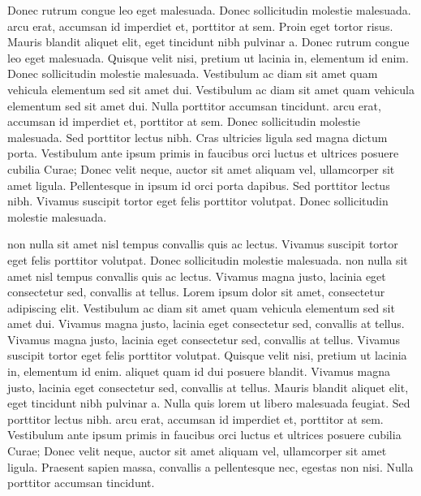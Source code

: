 \documentclass{article}
\begin{document}
Donec rutrum congue leo eget malesuada. Donec sollicitudin molestie malesuada.  arcu erat, accumsan id imperdiet et, porttitor at sem. Proin eget tortor risus. Mauris blandit aliquet elit, eget tincidunt nibh pulvinar a. Donec rutrum congue leo eget malesuada. Quisque velit nisi, pretium ut lacinia in, elementum id enim. Donec sollicitudin molestie malesuada. Vestibulum ac diam sit amet quam vehicula elementum sed sit amet dui. Vestibulum ac diam sit amet quam vehicula elementum sed sit amet dui. Nulla porttitor accumsan tincidunt.  arcu erat, accumsan id imperdiet et, porttitor at sem. Donec sollicitudin molestie malesuada. Sed porttitor lectus nibh. Cras ultricies ligula sed magna dictum porta. Vestibulum ante ipsum primis in faucibus orci luctus et ultrices posuere cubilia Curae; Donec velit neque, auctor sit amet aliquam vel, ullamcorper sit amet ligula. Pellentesque in ipsum id orci porta dapibus. Sed porttitor lectus nibh. Vivamus suscipit tortor eget felis porttitor volutpat. Donec sollicitudin molestie malesuada.


 non nulla sit amet nisl tempus convallis quis ac lectus. Vivamus suscipit tortor eget felis porttitor volutpat. Donec sollicitudin molestie malesuada.  non nulla sit amet nisl tempus convallis quis ac lectus. Vivamus magna justo, lacinia eget consectetur sed, convallis at tellus. Lorem ipsum dolor sit amet, consectetur adipiscing elit. Vestibulum ac diam sit amet quam vehicula elementum sed sit amet dui. Vivamus magna justo, lacinia eget consectetur sed, convallis at tellus. Vivamus magna justo, lacinia eget consectetur sed, convallis at tellus. Vivamus suscipit tortor eget felis porttitor volutpat. Quisque velit nisi, pretium ut lacinia in, elementum id enim.  aliquet quam id dui posuere blandit. Vivamus magna justo, lacinia eget consectetur sed, convallis at tellus. Mauris blandit aliquet elit, eget tincidunt nibh pulvinar a. Nulla quis lorem ut libero malesuada feugiat. Sed porttitor lectus nibh.  arcu erat, accumsan id imperdiet et, porttitor at sem. Vestibulum ante ipsum primis in faucibus orci luctus et ultrices posuere cubilia Curae; Donec velit neque, auctor sit amet aliquam vel, ullamcorper sit amet ligula. Praesent sapien massa, convallis a pellentesque nec, egestas non nisi. Nulla porttitor accumsan tincidunt.
\end{document}
